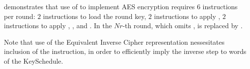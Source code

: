 demonstrates that use of  to implement AES encryption requires
$ 6$ instructions per round:
$ 2$            
     instructions to load the round key,
$ 2$            
     instructions to apply ,
$ 2$   
     instructions to apply , , and .
In the $Nr$-th round, which omits ,
is replaced by 
     .

Note that use of the Equivalent Inverse Cipher representation
nessesitates inclusion of the  instruction, in order
to efficiently imply the inverse  step to words
of the KeySchedule.

